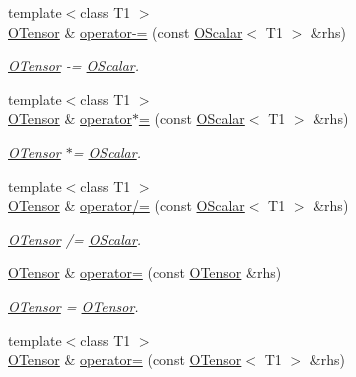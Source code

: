 \begin{DoxyCompactItemize}
{\footnotesize template$<$class T1 $>$ }\\\mbox{\hyperlink{classENSEM_1_1OTensor}{O\+Tensor}} \& \mbox{\hyperlink{classENSEM_1_1OTensor_a61ebd11eac882623ea080293b007972b}{operator-\/=}} (const \mbox{\hyperlink{classENSEM_1_1OScalar}{O\+Scalar}}$<$ T1 $>$ \&rhs)
\begin{DoxyCompactList}\small\item\em \mbox{\hyperlink{classENSEM_1_1OTensor}{O\+Tensor}} -\/= \mbox{\hyperlink{classENSEM_1_1OScalar}{O\+Scalar}}. \end{DoxyCompactList}\item 
{\footnotesize template$<$class T1 $>$ }\\\mbox{\hyperlink{classENSEM_1_1OTensor}{O\+Tensor}} \& \mbox{\hyperlink{classENSEM_1_1OTensor_a0326883980545068700bbdd762df5904}{operator$\ast$=}} (const \mbox{\hyperlink{classENSEM_1_1OScalar}{O\+Scalar}}$<$ T1 $>$ \&rhs)
\begin{DoxyCompactList}\small\item\em \mbox{\hyperlink{classENSEM_1_1OTensor}{O\+Tensor}} $\ast$= \mbox{\hyperlink{classENSEM_1_1OScalar}{O\+Scalar}}. \end{DoxyCompactList}\item 
{\footnotesize template$<$class T1 $>$ }\\\mbox{\hyperlink{classENSEM_1_1OTensor}{O\+Tensor}} \& \mbox{\hyperlink{classENSEM_1_1OTensor_a02520659679c7946a5bb0ce75b3824cb}{operator/=}} (const \mbox{\hyperlink{classENSEM_1_1OScalar}{O\+Scalar}}$<$ T1 $>$ \&rhs)
\begin{DoxyCompactList}\small\item\em \mbox{\hyperlink{classENSEM_1_1OTensor}{O\+Tensor}} /= \mbox{\hyperlink{classENSEM_1_1OScalar}{O\+Scalar}}. \end{DoxyCompactList}\item 
\mbox{\hyperlink{classENSEM_1_1OTensor}{O\+Tensor}} \& \mbox{\hyperlink{classENSEM_1_1OTensor_a08690a1808269fccd113a9d634c7a73f}{operator=}} (const \mbox{\hyperlink{classENSEM_1_1OTensor}{O\+Tensor}} \&rhs)
\begin{DoxyCompactList}\small\item\em \mbox{\hyperlink{classENSEM_1_1OTensor}{O\+Tensor}} = \mbox{\hyperlink{classENSEM_1_1OTensor}{O\+Tensor}}. \end{DoxyCompactList}\item 
{\footnotesize template$<$class T1 $>$ }\\\mbox{\hyperlink{classENSEM_1_1OTensor}{O\+Tensor}} \& \mbox{\hyperlink{classENSEM_1_1OTensor_a96fac7277ac1df849789d53b761e5e68}{operator=}} (const \mbox{\hyperlink{classENSEM_1_1OTensor}{O\+Tensor}}$<$ T1 $>$ \&rhs)

\end{DoxyCompactItemize}

